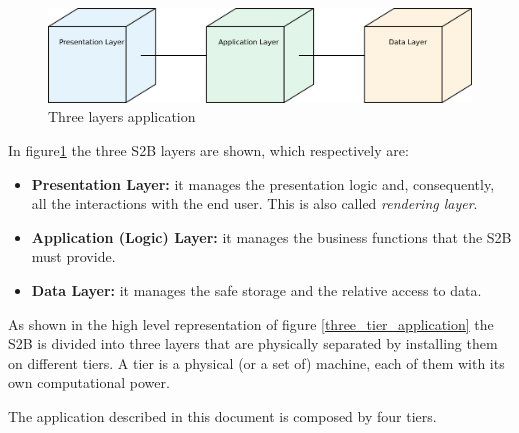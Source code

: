\documentclass[table, 12pt]{article}
\begin{document}
\begin{figure}[H]
    \begin{center}
        \includegraphics[width=\textwidth]{assets/Architectural-Design/3-tier.png}
        \caption{Three layers application}\label{three_tier_desc}
    \end{center}
\end{figure}

In figure\ref{three_tier_desc} the three S2B layers are shown, which respectively are:
\begin{itemize}
    \item \textbf{Presentation Layer:} it manages the presentation logic and, consequently, all the interactions with the end user. This is also called \textit{rendering layer}.
    \item \textbf{Application (Logic) Layer:} it manages the business functions that the S2B must provide.
    \item \textbf{Data Layer:} it manages the safe storage and the relative access to data.
\end{itemize}

As shown in the high level representation of figure \ref{three_tier_application} the S2B is divided into three layers that are physically separated by installing them on different tiers. A tier is a physical (or a set of) machine, each of them with its own computational power.

The application described in this document is composed by four tiers.
\end{document}
